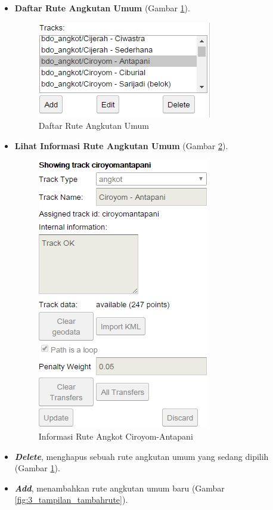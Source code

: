 \begin{enumerate}
\begin{itemize}
		\item \textbf{Daftar Rute Angkutan Umum} (Gambar \ref{fig:3_tampilan_daftarrute}).
		\begin{figure}[htbp]
			\centering
				\includegraphics[scale=0.5]{Gambar/3_tampilan_daftarrute.png}
			\caption{Daftar Rute Angkutan Umum}
			\label{fig:3_tampilan_daftarrute}
		\end{figure}
		\item \textbf{Lihat Informasi Rute Angkutan Umum} (Gambar \ref{fig:3_tampilan_informasirute}).
		\begin{figure}[htbp]
			\centering
				\includegraphics[scale=0.5]{Gambar/3_tampilan_informasirute.png}
			\caption{Informasi Rute Angkot Ciroyom-Antapani}
			\label{fig:3_tampilan_informasirute}
		\end{figure}
		\item \textbf{\textit{Delete}}, menghapus sebuah rute angkutan umum yang sedang dipilih (Gambar \ref{fig:3_tampilan_daftarrute}).
		\item \textbf{\textit{Add}}, menambahkan rute angkutan umum baru (Gambar \ref{fig:3_tampilan_tambahrute}).

\end{itemize}
\end{enumerate}
